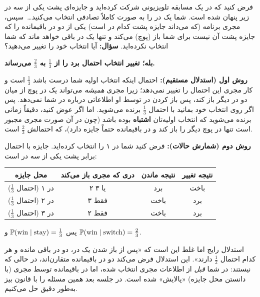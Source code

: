 \begin{example}
فرض کنید که در یک مسابقه تلویزیونی شرکت کرده‌اید و جایزه‌ای پشت یکی از سه در زیر پنهان شده است. شما یک در را به صورت کاملاً تصادفی انتخاب می‌کنید\ldots\ سپس، مجری برنامه (که می‌داند جایزه پشت کدام در است) یکی از دو در باقیمانده را که جایزه پشت آن نیست برای شما باز (پوچ) می‌کند و تنها یک در باقی خواهد ماند که شما انتخاب نکرده‌اید. \textbf{سؤال:} آیا انتخاب خود را تغییر می‌دهید؟
\begin{solution}
\textbf{بله؛ تغییر انتخاب احتمال برد را از $\frac13$ به $\frac23$ می‌رساند.}

\textbf{روش اول (استدلال مستقیم):} احتمال اینکه انتخاب اولیه شما درست باشد $\frac13$ است و کار مجری این احتمال را تغییر نمی‌دهد؛ زیرا مجری \emph{همیشه} می‌تواند یک در پوچ از میان دو در دیگر باز کند، پس باز کردن در توسط او اطلاعاتی درباره در شما نمی‌دهد. پس اگر روی انتخاب خود بمانید با احتمال $\frac13$ برنده می‌شوید. اما اگر عوض کنید، دقیقاً زمانی برنده می‌شوید که انتخاب اولیه‌تان \textbf{اشتباه} بوده باشد (چون در آن صورت مجری مجبور است تنها در پوچ دیگر را باز کند و در باقیمانده حتماً جایزه دارد)، که احتمالش $\frac23$ است.

\textbf{روش دوم (شمارش حالات):} فرض کنید شما در ۱ را انتخاب کرده‌اید. جایزه با احتمال برابر پشت یکی از سه در است:
\begin{center}
\renewcommand{\arraystretch}{1.3}
\begin{tabular}{c|c|c|c}
محل جایزه & دری که مجری باز می‌کند & نتیجه ماندن & نتیجه تغییر\\\hline
در ۱ (احتمال $\frac13$) & ۲ یا ۳ & برد & باخت\\
در ۲ (احتمال $\frac13$) & فقط ۳ & باخت & برد\\
در ۳ (احتمال $\frac13$) & فقط ۲ & باخت & برد
\end{tabular}
\end{center}
پس $\mathbb{P}(\text{win}\mid\text{stay})=\frac13$ و $\mathbb{P}(\text{win}\mid\text{switch})=\frac23$.
\end{solution}
\end{example}

\begin{warning}
\warntitle استدلال رایج اما غلط این است که «پس از باز شدن یک در، دو در باقی مانده و هر کدام احتمال $\frac12$ دارند». این استدلال فرض می‌کند دو در باقیمانده متقارن‌اند، در حالی که نیستند: در شما \emph{قبل} از اطلاعات مجری انتخاب شده، اما در باقیمانده توسط مجری (با دانستن محل جایزه) «پالایش» شده است. در جلسه بعد همین مسئله را با قانون بیز به‌طور دقیق حل می‌کنیم.
\end{warning}

